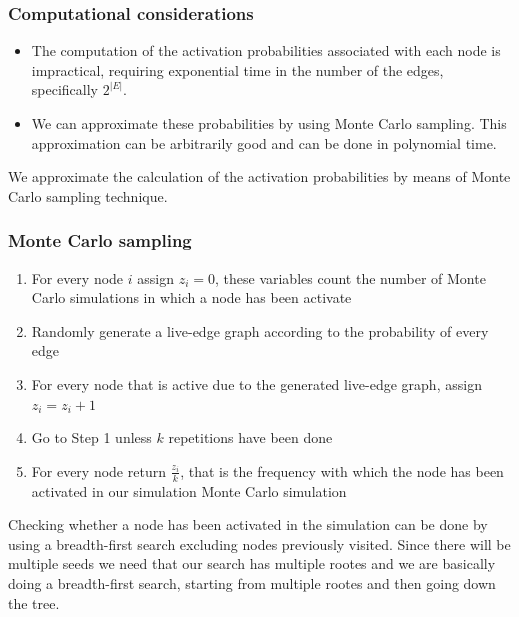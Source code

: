 \documentclass[10pt,a4paper]{article}
\begin{document}
\subsubsection{Computational considerations}\label{computational-considerations}

\begin{itemize}

\item The computation of the activation probabilities associated with each node is impractical, requiring exponential time in the number of the edges, specifically $2^{|E|}$.
\item We can approximate these probabilities by using Monte Carlo sampling. This approximation can be arbitrarily good and can be done in polynomial time.
\end{itemize}

We approximate the calculation of the activation probabilities by means of Monte Carlo sampling technique.

\subsubsection{Monte Carlo sampling}\label{monte-carlo-sampling}
\begin{shaded}
\begin{enumerate}
\item For every node $i$ assign $z_i = 0$, these variables count the number of Monte Carlo simulations in which a node has been activate
\item Randomly generate a live-edge graph according to the probability of every edge
\item For every node that is active due to the generated live-edge graph, assign $z_i = z_i + 1$
\item Go to Step 1 unless $k$ repetitions have been done
\item For every node return $\frac{z_i}{k}$, that is the frequency with which the node has been activated in our simulation Monte Carlo simulation
\end{enumerate}
\end{shaded}

Checking whether a node has been activated in the simulation can be done by using a breadth-first search excluding nodes previously visited. Since there will be multiple seeds we need that our search has multiple rootes and we are basically doing a breadth-first search, starting from multiple rootes and then going down the tree.
\end{document}
